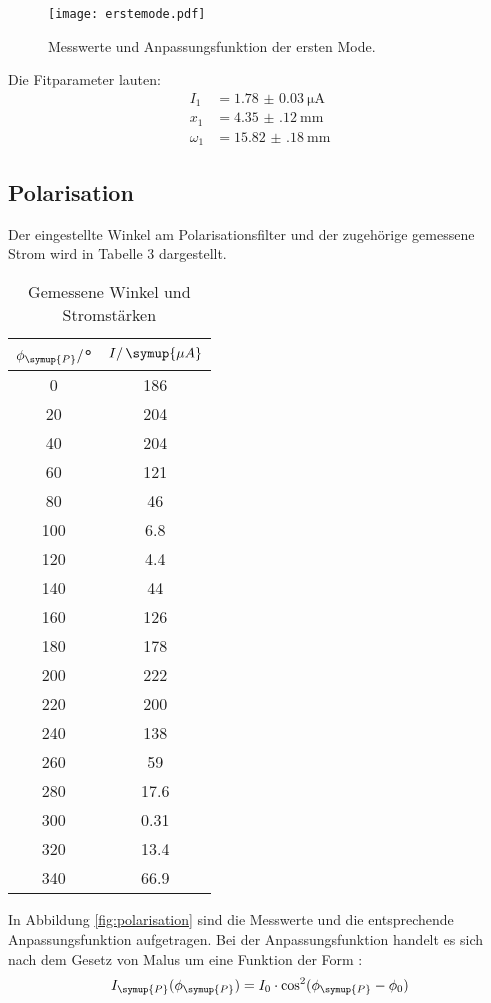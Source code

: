 \begin{figure}[H]
  \centering
  \texttt{[image: erstemode.pdf]}
  \caption{Messwerte und Anpassungsfunktion der ersten Mode.}
  \label{fig:erstemode}
\end{figure}

Die Fitparameter lauten:
\begin{align*}
  I_1 &= \SI{1.78(3)}{\micro\ampere} \\
  x_1 &= \SI{4.35(12)}{\milli\meter} \\
  \omega_1 &= \SI{15.82(18)}{\milli\meter}
\end{align*}

\subsection{Polarisation}
Der eingestellte Winkel am Polarisationsfilter und der zugehörige gemessene Strom
wird in Tabelle 3 dargestellt.

\begin{table}[H]
\centering
\caption{Gemessene Winkel und Stromstärken}
\begin{tabular}{c c}
  \toprule
    {$\phi_{\symup{P}}/$°} & {$I/\, \symup{\mu A}$} \\
    \midrule
    0   &   186  \\
    20  &   204  \\
    40  &   204  \\
    60  &   121  \\
    80  &    46  \\
    100 &   6.8  \\
    120 &   4.4  \\
    140 &    44  \\
    160 &   126  \\
    180 &   178  \\
    200 &   222  \\
    220 &   200  \\
    240 &   138  \\
    260 &    59  \\
    280 &  17.6  \\
    300 &  0.31  \\
    320 &  13.4  \\
    340 &  66.9  \\
    \bottomrule
  \end{tabular}
\end{table}

In Abbildung \ref{fig:polarisation} sind die Messwerte und die entsprechende
Anpassungsfunktion aufgetragen. Bei der Anpassungsfunktion handelt es sich nach dem
Gesetz von Malus um eine Funktion der Form \cite{sample1}:
\begin{equation*}
  I_\symup{P}(\phi_\symup{P}) = I_0 \cdot \cos^2(\phi_\symup{P} - \phi_0)
\end{equation*}

